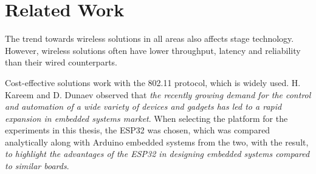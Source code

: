   
\chapter{Related Work}



The trend towards wireless solutions in all areas also affects stage technology.
However, wireless solutions often have lower throughput, latency and reliability than their wired counterparts.

Cost-effective solutions work with the 802.11 protocol, which is widely used. 
H. Kareem and D. Dunaev \cite{TheWorkingPrincipalsOfESP32} observed that
\emph{the recently growing demand for the control and automation of a wide variety of devices and gadgets has
led to a rapid expansion in embedded systems market}.
When selecting the platform for the experiments in this thesis, the ESP32 was chosen, 
which was compared analytically along with Arduino embedded systems from the two,
with the result, \emph{to highlight the advantages of the ESP32 in designing embedded systems compared to similar boards}.


